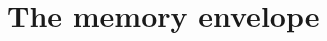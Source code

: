 \documentclass[final,hyperref={pdfpagelabels=false,bookmarks=false}]{beamer}
\DeclareMathOperator{\SNR}{SNR}
\newcommand{\eq}{\mathbf{p}^\infty}
\newcommand{\CI}{\mathcal{I}}
\begin{document}
\begin{frame}{}
\begin{columns}[t]
\begin{column}{0.33\linewidth}
%
%
%
%
%
%
%
%
%




\section{The memory envelope}



\end{column}
\end{columns}
\end{frame}
\end{document}
